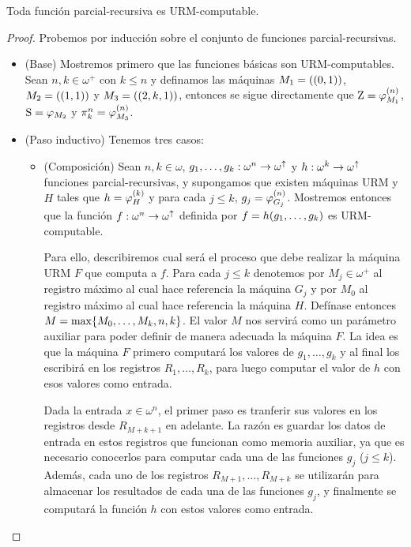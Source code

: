 \begin{theorem}
	\label{theo: parcial_implica_urm} %
	Toda función parcial-recursiva es URM-computable.
\end{theorem}

\begin{proof}
	Probemos por inducción sobre el conjunto de funciones parcial-recursivas.

	\begin{itemize}
		\item (Base) Mostremos primero que las funciones básicas son URM-computables. Sean $n, k\in\omega^{+}$ con $k\leq n$ y definamos las máquinas $M_{1} =\pa*{\pa*{0, 1}}$, $M_{2} =\pa*{\pa*{1, 1}}$ y $M_{3} =\pa*{\pa*{2, k, 1}}$, entonces se sigue directamente que $\CERO =\PHI{M_{1}}[n]$, $\SUCESOR =\PHI{M_{2}}$ y $\PROYECCION{n}{k} =\PHI{M_{3}}[n]$.

		\item (Paso inductivo) Tenemos tres casos:

		\begin{itemize}
			\item (Composición) Sean $n, k\in\omega$, $g_{1},\dotsc, g_{k}:\omega^{n}\to\omega^{\DIVERGE}$ y $h:\omega^{k}\to\omega^{\DIVERGE}$  funciones parcial-recursivas, y supongamos que existen máquinas URM  y $H$ tales que $h =\PHI{H}[k]$ y para cada $j\leq k$, $g_{j} =\PHI{G_{j}}[n]$. Mostremos entonces que la función $f:\omega^{n}\to\omega^{\DIVERGE}$ definida por $f = h\pa*{g_{1},\dotsc, g_{k}}$ es URM-computable.

	Para ello, describiremos cual será el proceso que debe realizar la máquina URM $F$ que computa a $f$. Para cada $j\leq k$ denotemos por $M_{j}\in\omega^{+}$ al registro máximo al cual hace referencia la máquina $G_{j}$ y por $M_{0}$ al registro máximo al cual hace referencia la máquina $H$. Defínase entonces $M =\max\set*{M_{0},\dotsc, M_{k}, n, k}$. El valor $M$ nos servirá como un parámetro auxiliar para poder definir de manera adecuada la máquina $F$. La idea es que la máquina $F$ primero computará los valores de $g_{1},\dotsc, g_{k}$ y al final los escribirá en los registros $R_{1},\dotsc, R_{k}$, para luego computar el valor de $h$ con esos valores como entrada.

	Dada la entrada $x\in\omega^{n}$, el primer paso es tranferir sus valores en los registros desde $R_{M + k + 1}$ en adelante. La razón es guardar los datos de entrada en estos registros que funcionan como memoria auxiliar, ya que es necesario conocerlos para computar cada una de las funciones $g_{j}$ ($j\leq k$). Además, cada uno de los registros $R_{M + 1},\dotsc, R_{M + k}$ se utilizarán para almacenar los resultados de cada una de las funciones $g_{j}$, y finalmente se computará la función $h$ con estos valores como entrada.


\end{itemize}
\end{itemize}
\end{proof}
